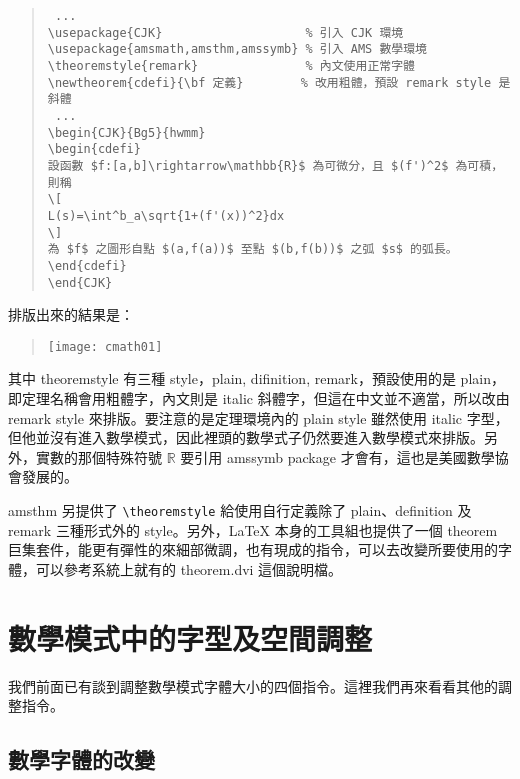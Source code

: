 \begin{quote}
  \begin{verbatim}
 ...
\usepackage{CJK}                    % 引入 CJK 環境
\usepackage{amsmath,amsthm,amssymb} % 引入 AMS 數學環境
\theoremstyle{remark}               % 內文使用正常字體
\newtheorem{cdefi}{\bf 定義}        % 改用粗體，預設 remark style 是斜體
 ...
\begin{CJK}{Bg5}{hwmm}
\begin{cdefi}
設函數 $f:[a,b]\rightarrow\mathbb{R}$ 為可微分，且 $(f')^2$ 為可積，則稱
\[
L(s)=\int^b_a\sqrt{1+(f'(x))^2}dx
\]
為 $f$ 之圖形自點 $(a,f(a))$ 至點 $(b,f(b))$ 之弧 $s$ 的弧長。
\end{cdefi}
\end{CJK}
\end{verbatim}
\end{quote}

排版出來的結果是：

\begin{quote}
  \texttt{[image: cmath01]}
\end{quote}

其中 {\ttfamily theoremstyle} 有三種 style，{\ttfamily plain, difinition, remark}，預設使用的是 {\ttfamily plain}，即定理名稱會用粗體字，內文則是 italic 斜體字，但這在中文並不適當，所以改由 {\ttfamily remark} style 來排版。要注意的是定理環境內的 {\ttfamily plain} style 雖然使用 italic 字型，但他並沒有進入數學模式，因此裡頭的數學式子仍然要進入數學模式來排版。另外，實數的那個特殊符號 $\mathbb{R}$ 要引用 {\sffamily amssymb} package 才會有，這也是美國數學協會發展的。


{\sffamily amsthm} 另提供了 \verb|\theoremstyle| 給使用自行定義除了 {\ttfamily plain}、{\ttfamily definition} 及 {\ttfamily remark} 三種形式外的 style。另外，\LaTeX{} 本身的工具組也提供了一個 {\sffamily theorem} 巨集套件，能更有彈性的來細部微調，也有現成的指令，可以去改變所要使用的字體，可以參考系統上就有的 {\ttfamily theorem.dvi} 這個說明檔。

\section{數學模式中的字型及空間調整}

我們前面已有談到調整數學模式字體大小的四個指令。這裡我們再來看看其他的調整指令。

\subsection{數學字體的改變}


